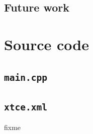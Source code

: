 \documentclass[a4paper,nobib]{tufte-book}
\begin{document}

\section{Future work}

\appendix

\begin{fullwidth}
\printbibliography[heading=bibnumbered]
\end{fullwidth}


\printindex

\chapter{Source code}
\label{sec:source_code}



\section*{\texttt{main.cpp}}


\newpage
\section*{\texttt{xtce.xml}}
\label{app:xtce}

fixme


\end{document}
